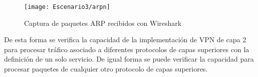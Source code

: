 \begin{figure}[h!] 
\centering    
\texttt{[image: Escenario3/arpn]}
\caption[Captura de paquetes ARP recibidos con Wireshark]{Captura de paquetes ARP recibidos con Wireshark}
\label{fig:CapturaTCP}
\end{figure}


De esta forma se verifica la capacidad de la implementaci\'on de VPN de capa 2 para procesar tr\'afico asociado a diferentes protocolos de capas superiores con la definici\'on de un solo servicio. De igual forma se puede verificar la capacidad para procesar paquetes de cualquier otro protocolo de capas superiores.\\ 